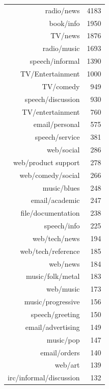\documentclass[xcolor=x11names,compress,handout]{beamer}
\begin{document}
{\begin{columns}
        \begin{table}[ht]
            \centering
            \begin{tabular}{rr}
                radio/news & 4183 \\ 
                book/info & 1950 \\ 
                TV/news & 1876 \\ 
                radio/music & 1693 \\ 
                speech/informal & 1390 \\ 
                TV/Entertainment & 1000 \\ 
                TV/comedy &  949 \\ 
                speech/discussion &  930 \\ 
                TV/entertainment &  760 \\ 
                email/personal &  575 \\ 
                speech/service &  381 \\ 
                web/social &  286 \\ 
                web/product support &  278 \\ 
                web/comedy/social &  266 \\ 
                music/blues &  248 \\ 
                email/academic &  247 \\ 
                file/documentation &  238 \\ 
                speech/info &  225 \\ 
                web/tech/news &  194 \\ 
                web/tech/reference &  185 \\ 
                web/news &  184 \\ 
                music/folk/metal &  183 \\ 
                web/music &  173 \\ 
                music/progressive &  156 \\ 
                speech/greeting &  150 \\ 
                email/advertising &  149 \\ 
                music/pop &  147 \\ 
                email/orders &  140 \\ 
                web/art &  139 \\ 
                irc/informal/discussion &  132 \\ 

\end{tabular}
\end{table}
\end{columns}}
\end{document}
